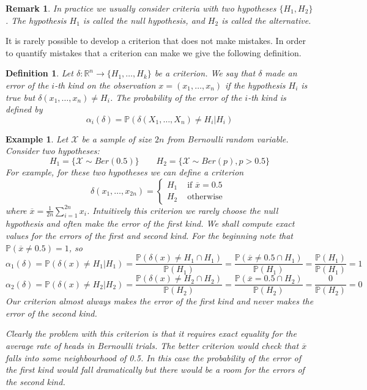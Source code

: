 \documentclass[12pt]{article}
\newtheorem{remark}[theorem]{Remark}
\newtheorem{definition}[theorem]{Definition}
\newtheorem{example}[theorem]{Example}
\begin{document}
\begin{remark} In practice we usually consider criteria with two hypotheses
    $\{H_1, H_2\}$. The hypothesis $H_1$ is called the null hypothesis, and
    $H_2$ is called the alternative.
\end{remark}

It is rarely possible to develop a criterion that does not make mistakes. In
order to quantify mistakes that a criterion can make we give the following
definition.

\begin{definition} Let $\delta:\mathbb{R}^n\to \{H_1,\ldots,H_k\}$ be a
    criterion. We say that $\delta$ made an error of the $i$-th kind on the
    observation $x=(x_1,\ldots,x_n)$ if the hypothesis $H_i$ is true but
    $\delta(x_1,\ldots,x_n)\neq H_i$. The probability of the error of the $i$-th
    kind is defined by
    $$
        \alpha_i(\delta)=\mathbb{P}(\delta(X_1,\ldots,X_n)\neq H_i | H_i)
    $$
\end{definition}

\begin{example} Let $\mathscr{X}$ be a sample of size $2n$ from Bernoulli random
    variable. Consider two hypotheses:
    $$
        H_1=\{\mathscr{X}\sim Ber(0.5)\}
        \quad\quad
        H_2=\{\mathscr{X}\sim Ber(p), p>0.5\}
    $$
    For example, for these two hypotheses we can define a criterion
    $$
        \delta(x_1,\ldots,x_{2n})
        =\begin{cases}
            H_1 & \mbox{ if } \overline{x}=0.5 \\
            H_2 & \mbox{ otherwise }
        \end{cases}
    $$
    where $\overline{x}=\frac{1}{2n}\sum_{i=1}^{2n} x_i$. Intuitively this
    criterion we rarely choose the null hypothesis and often make the error of
    the first kind. We shall compute exact values for the errors of the first
    and second kind. For the beginning note that $\mathbb{P}(\overline{x}\neq
        0.5)=1$, so
    $$
        \alpha_1(\delta)
        =\mathbb{P}(\delta(x)\neq H_1|H_1)
        =\frac{\mathbb{P}(\delta(x)\neq H_1 \cap H_1)}{\mathbb{P}(H_1)}
        =\frac{\mathbb{P}(\overline{x}\neq 0.5 \cap H_1)}{\mathbb{P}(H_1)}
        =\frac{\mathbb{P}(H_1)}{\mathbb{P}(H_1)}
        =1
    $$
    $$
        \alpha_2(\delta)
        =\mathbb{P}(\delta(x)\neq H_2|H_2)
        =\frac{\mathbb{P}(\delta(x)\neq H_2 \cap H_2)}{\mathbb{P}(H_2)}
        =\frac{\mathbb{P}(\overline{x}= 0.5 \cap H_2)}{\mathbb{P}(H_2)}
        =\frac{0}{\mathbb{P}(H_2)}
        =0
    $$
    Our criterion almost always makes the error of the first kind and never
    makes the error of the second kind.

    Clearly the problem with this criterion is that it requires exact equality
    for the average rate of heads in Bernoulli trials. The better criterion
    would check that $\overline{x}$ falls into some neighbourhood of 0.5. In
    this case the probability of the error of the first kind would fall
    dramatically but there would be a room for the errors of the second kind.
\end{example}
\end{document}
